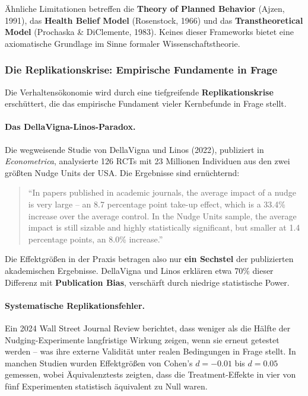 Ähnliche Limitationen betreffen die \textbf{Theory of Planned Behavior} (Ajzen, 1991), das \textbf{Health Belief Model} (Rosenstock, 1966) und das \textbf{Transtheoretical Model} (Prochaska \& DiClemente, 1983). Keines dieser Frameworks bietet eine axiomatische Grundlage im Sinne formaler Wissenschaftstheorie.

\subsubsection{Die Replikationskrise: Empirische Fundamente in Frage}

Die Verhaltensökonomie wird durch eine tiefgreifende \textbf{Replikationskrise} erschüttert, die das empirische Fundament vieler Kernbefunde in Frage stellt.

\paragraph{Das DellaVigna-Linos-Paradox.}
Die wegweisende Studie von DellaVigna und Linos (2022), publiziert in \textit{Econometrica}, analysierte 126 RCTs mit 23 Millionen Individuen aus den zwei größten Nudge Units der USA. Die Ergebnisse sind ernüchternd:

\begin{quote}
``In papers published in academic journals, the average impact of a nudge is very large -- an 8.7 percentage point take-up effect, which is a 33.4\% increase over the average control. In the Nudge Units sample, the average impact is still sizable and highly statistically significant, but smaller at 1.4 percentage points, an 8.0\% increase.''
\end{quote}

Die Effektgrößen in der Praxis betragen also nur \textbf{ein Sechstel} der publizierten akademischen Ergebnisse. DellaVigna und Linos erklären etwa 70\% dieser Differenz mit \textbf{Publication Bias}, verschärft durch niedrige statistische Power.

\paragraph{Systematische Replikationsfehler.}
Ein 2024 Wall Street Journal Review berichtet, dass weniger als die Hälfte der Nudging-Experimente langfristige Wirkung zeigen, wenn sie erneut getestet werden -- was ihre externe Validität unter realen Bedingungen in Frage stellt. In manchen Studien wurden Effektgrößen von Cohen's $d = -0.01$ bis $d = 0.05$ gemessen, wobei Äquivalenztests zeigten, dass die Treatment-Effekte in vier von fünf Experimenten statistisch äquivalent zu Null waren.

